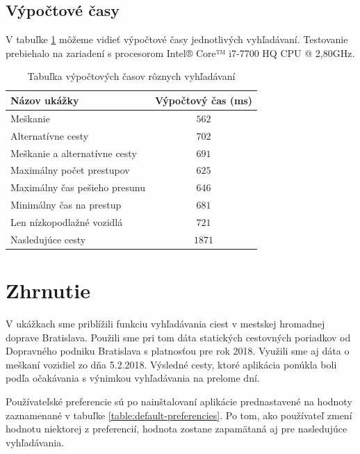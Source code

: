 \subsection{Výpočtové časy}
V tabuľke \ref{table:execution-time} môžeme vidieť výpočtové časy jednotlivých vyhľadávaní. Testovanie prebiehalo na zariadení s procesorom Intel® Core™ i7-7700 HQ CPU @ 2,80GHz.
\begin{table}[H]
\small
\begin{center}
\begin{tabular}{|l|c|}
\hline
\rowcolor[HTML]{C0C0C0} 
\textbf{Názov ukážky} & \textbf{Výpočtový čas (ms)} \\ \hline
Meškanie  & $562$         \\ \hline
Alternatívne cesty & $702$  \\ \hline
Meškanie a alternatívne cesty & $691$  \\ \hline
Maximálny počet prestupov & $625$  \\ \hline
Maximálny čas pešieho presunu & $646$  \\ \hline
Minimálny čas na prestup & $681$  \\ \hline
Len nízkopodlažné vozidlá & $721$  \\ \hline
Nasledujúce cesty & $1871$  \\ \hline
\end{tabular}
\end{center}
\caption{Tabuľka výpočtových časov rôznych vyhľadávaní}
\label{table:execution-time}
\end{table}

\section{Zhrnutie}
V ukážkach sme priblížili funkciu vyhľadávania ciest v mestskej hromadnej doprave Bratislava. Použili sme pri tom dáta statických cestovných poriadkov od Dopravného podniku Bratislava s platnosťou pre rok 2018. Využili sme aj dáta o meškaní vozidiel zo dňa 5.2.2018. Výsledné cesty, ktoré aplikácia ponúkla boli podľa očakávania s výnimkou vyhľadávania na prelome dní. 

Používateľské preferencie sú po nainštalovaní aplikácie prednastavené na hodnoty zaznamenané v tabuľke \ref{table:default-preferencies}. Po tom, ako používateľ zmení hodnotu niektorej z preferencií, hodnota zostane zapamätaná aj pre nasledujúce vyhľadávania. 

